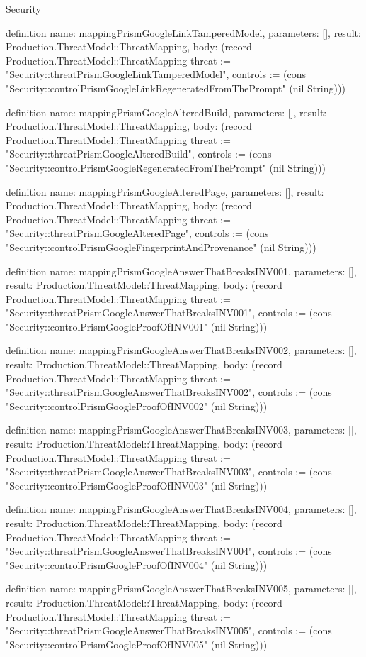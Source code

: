 \begin{lexlean}{Security}
\begin{semanticmodule}
definition{
  name: mappingPrismGoogleLinkTamperedModel,
  parameters: [],
  result: Production.ThreatModel::ThreatMapping,
  body: (record Production.ThreatModel::ThreatMapping {threat := "Security::threatPrismGoogleLinkTamperedModel", controls := (cons "Security::controlPrismGoogleLinkRegeneratedFromThePrompt" (nil String))})
}

definition{
  name: mappingPrismGoogleAlteredBuild,
  parameters: [],
  result: Production.ThreatModel::ThreatMapping,
  body: (record Production.ThreatModel::ThreatMapping {threat := "Security::threatPrismGoogleAlteredBuild", controls := (cons "Security::controlPrismGoogleRegeneratedFromThePrompt" (nil String))})
}

definition{
  name: mappingPrismGoogleAlteredPage,
  parameters: [],
  result: Production.ThreatModel::ThreatMapping,
  body: (record Production.ThreatModel::ThreatMapping {threat := "Security::threatPrismGoogleAlteredPage", controls := (cons "Security::controlPrismGoogleFingerprintAndProvenance" (nil String))})
}

definition{
  name: mappingPrismGoogleAnswerThatBreaksINV001,
  parameters: [],
  result: Production.ThreatModel::ThreatMapping,
  body: (record Production.ThreatModel::ThreatMapping {threat := "Security::threatPrismGoogleAnswerThatBreaksINV001", controls := (cons "Security::controlPrismGoogleProofOfINV001" (nil String))})
}

definition{
  name: mappingPrismGoogleAnswerThatBreaksINV002,
  parameters: [],
  result: Production.ThreatModel::ThreatMapping,
  body: (record Production.ThreatModel::ThreatMapping {threat := "Security::threatPrismGoogleAnswerThatBreaksINV002", controls := (cons "Security::controlPrismGoogleProofOfINV002" (nil String))})
}

definition{
  name: mappingPrismGoogleAnswerThatBreaksINV003,
  parameters: [],
  result: Production.ThreatModel::ThreatMapping,
  body: (record Production.ThreatModel::ThreatMapping {threat := "Security::threatPrismGoogleAnswerThatBreaksINV003", controls := (cons "Security::controlPrismGoogleProofOfINV003" (nil String))})
}

definition{
  name: mappingPrismGoogleAnswerThatBreaksINV004,
  parameters: [],
  result: Production.ThreatModel::ThreatMapping,
  body: (record Production.ThreatModel::ThreatMapping {threat := "Security::threatPrismGoogleAnswerThatBreaksINV004", controls := (cons "Security::controlPrismGoogleProofOfINV004" (nil String))})
}

definition{
  name: mappingPrismGoogleAnswerThatBreaksINV005,
  parameters: [],
  result: Production.ThreatModel::ThreatMapping,
  body: (record Production.ThreatModel::ThreatMapping {threat := "Security::threatPrismGoogleAnswerThatBreaksINV005", controls := (cons "Security::controlPrismGoogleProofOfINV005" (nil String))})
}


\end{semanticmodule}
\end{lexlean}
